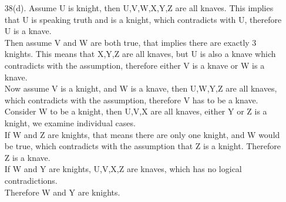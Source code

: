 \documentclass[12pt]{article}
\begin{document}
\begin{enumerate}
\begin{enumerate}
                \item[38(d).] Assume U is knight, then U,V,W,X,Y,Z are all knaves. This implies that U is speaking truth and is a knight, which contradicts with U, therefore U is a knave.\\
                Then assume V and W are both true, that implies there are exactly 3 knights. This means that X,Y,Z are all knaves, but U is also a knave which contradicts with the assumption, therefore either V is a knave or W is a knave.\\
                Now assume V is a knight, and W is a knave, then U,W,Y,Z are all knaves, which contradicts with the assumption, therefore V has to be a knave. \\
                Consider W to be a knight, then U,V,X are all knaves, either Y or Z is a knight, we examine individual cases.\\
                If W and Z are knights, that means there are only one knight, and W would be true, which contradicts with the assumption that Z is a knight. Therefore Z is a knave.\\
                If W and Y are knights, U,V,X,Z are knaves, which has no logical contradictions.\\
                Therefore W and Y are knights. 
            \end{enumerate}
        \newpage


\end{enumerate}
\end{document}
